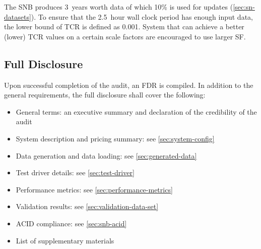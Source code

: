 The SNB \datagen produces 3~years worth data of which 10\% is used for updates (\autoref{sec:sn-datasets}).
To ensure that the 2.5~hour wall clock period has enough input data, the lower bound of TCR is defined as 0.001. System that can achieve a better (\ie lower) TCR values on a certain scale factors are encouraged to use larger SF.


\subsection{Full Disclosure}
Upon successful completion of the audit, an FDR is compiled. In addition to the general requirements, the full disclosure shall cover the following:

\begin{itemize}
    \item General terms: an executive summary and declaration of the credibility of the audit
    \item System description and pricing summary: see \autoref{sec:system-config}
    \item Data generation and data loading: see \autoref{sec:generated-data}
    \item Test driver details: see \autoref{sec:test-driver}
    \item Performance metrics: see \autoref{sec:performance-metrics}
    \item Validation results: see \autoref{sec:validation-data-set}
    \item ACID compliance: see \autoref{sec:snb-acid}
    \item List of supplementary materials
\end{itemize}

